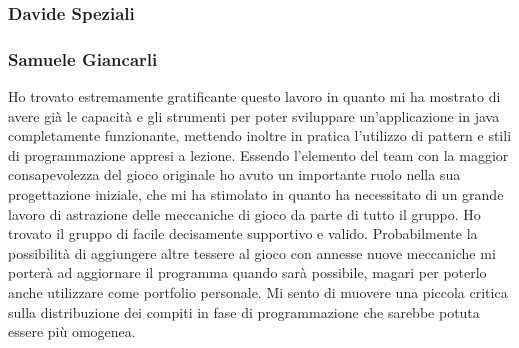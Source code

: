 \subsubsection*{Davide Speziali}

\subsubsection*{Samuele Giancarli}
Ho trovato estremamente gratificante questo lavoro in quanto mi ha mostrato di avere già le capacità e gli strumenti per poter sviluppare un'applicazione in java completamente funzionante, mettendo inoltre in pratica l'utilizzo di pattern e stili di programmazione appresi a lezione. Essendo l'elemento del team con la maggior consapevolezza del gioco originale ho avuto un importante ruolo nella sua progettazione iniziale, che mi ha stimolato in quanto ha necessitato di un grande lavoro di astrazione delle meccaniche di gioco da parte di tutto il gruppo. Ho trovato il gruppo di facile  decisamente supportivo e valido. Probabilmente la possibilità di aggiungere altre tessere al gioco con annesse nuove meccaniche mi porterà ad aggiornare il programma quando sarà possibile, magari per poterlo anche utilizzare come portfolio personale. Mi sento di muovere una piccola critica sulla distribuzione dei compiti in fase di programmazione che sarebbe potuta essere più omogenea.

